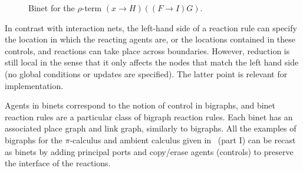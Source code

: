 \documentclass[copyright,creativecommons]{eptcs}
\begin{document}
\begin{figure}
\begin{center}
\end{center}
\caption{Binet for the $\rho$-term $(x \rightarrow H) ((F \rightarrow I)G)$.}
\label{fig:binet-ex}
\end{figure}


In contrast with interaction nets, the left-hand side of a reaction
rule can specify the location in which the reacting agents are, or
the locations contained in these controls, and reactions can take
place across boundaries.  However, reduction is still local in the
sense that it only affects the nodes that match the left hand side (no
global conditions or updates are specified).  The latter point is
relevant for implementation.  

Agents in binets correspond to the
notion of control in bigraphs, and binet reaction rules are a particular
class of bigraph reaction rules. Each binet 
has an associated place graph and link graph, similarly to bigraphs.
All the examples of bigraphs for the $\pi$-calculus and
ambient calculus given in~\cite{jensen03bigraphs} (part I) can be
recast as binets by adding principal ports and copy/erase agents (controls)
to preserve the interface of the reactions.
\end{document}
